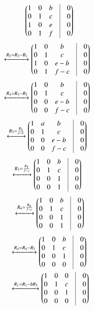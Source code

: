 \documentclass[journal,12pt,twocolumn]{IEEEtran}
\begin{document}
\begin{enumerate}
  \begin{align}
  \myvec{1&0&b&\vrule& 0\\0&1&c&\vrule& 0\\1&0&e&\vrule& 0\\0&1&f&\vrule& 0}\end{align}
  \begin{align}
    &\xleftrightarrow{R_3 = R_3-R_1}\myvec{1&0&b&\vrule& 0\\0&1&c&\vrule& 0\\1&0&e-b&\vrule& 0\\0&1&f-c&\vrule& 0}\end{align}\begin{align}
    &\xleftrightarrow{R_4 = R_4-R_2}\myvec{1&0&b&\vrule& 0\\0&1&c&\vrule& 0\\0&0&e-b&\vrule& 0\\0&0&f-c&\vrule& 0}\label{l}
  \end{align}
 \begin{align}
&\xleftrightarrow{R_3=\frac{R_3}{e-b}}\myvec{1&a&b&\vrule& 0\\0&1&c&\vrule& 0\\0&0&e-b&\vrule& 0\\0&0&f-c&\vrule& 0}\end{align}
   \begin{align}&\xleftrightarrow{R_3=\frac{R_3}{f-c}}\myvec{1&0&b&\vrule& 0\\0&1&c&\vrule& 0\\0&0&1&\vrule& 0\\0&0&1&\vrule& 0}\end{align}
   \begin{align}
   \xleftrightarrow{R_4=\frac{R_4}{f-c}}\myvec{1&0&b&\vrule& 0\\0&1&c&\vrule& 0\\0&0&1&\vrule& 0\\0&0&1&\vrule& 0}\end{align}
   \begin{align}
   &\xleftrightarrow{R_4=R_4-R_3}\myvec{1&0&b&\vrule& 0\\0&1&c&\vrule& 0\\0&0&1&\vrule& 0\\0&0&0&\vrule& 0}\\
    &\xleftrightarrow{R_1=R_1-bR_3}\myvec{1&0&0&\vrule& 0\\0&1&c&\vrule& 0\\0&0&1&\vrule& 0\\0&0&0&\vrule& 0}\\

\end{align}
\end{enumerate}
\end{document}
